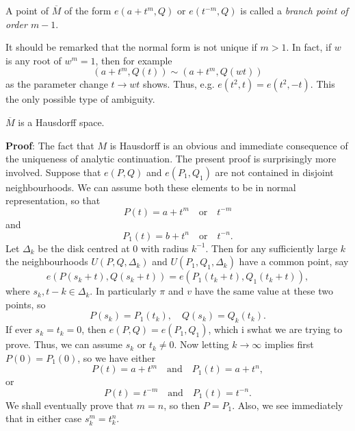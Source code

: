 \documentclass[a4paper,11pt]{article}
\begin{document}
A point of $\overline{M}$ of the form $e(a+t^m, Q)$ or $e(t^{-m}, Q)$
is called a \emph{branch point of order $m-1$}.

It should be remarked that the normal form is not unique if $m > 1$.
In fact, if $w$ is any root of $w^m = 1$, then for example
$$
(a + t^m, Q(t)) \sim (a + t^m, Q(wt))
$$
as the parameter change $t \to wt$ shows.  Thus, e.g. $e(t^2, t) =
e(t^2, -t)$.  This the only possible type of ambiguity.

\begin{propn}
  \label{propn:2}
  $\overline{M}$ is a Hausdorff space.
\end{propn}

\begin{mdframed}
  \textbf{Proof}:  The fact that $M$ is Hausdorff is an obvious and
  immediate consequence of the uniqueness of analytic continuation.
  The present proof is surprisingly more involved.  Suppose that
  $e(P,Q)$ and $e(P_1,Q_1)$ are not contained in disjoint
  neighbourhoods.  We can assume both these elements to be in normal
  representation, so that
  $$
  P(t) = a + t^m \quad \text{or}\quad t^{-m}
  $$
  and
  $$
  P_1(t) = b + t^n \quad \text{or}\quad t^{-n}.
  $$
  Let $\Delta_k$ be the disk centred at 0 with radius $k^{-1}$.  Then
  for any sufficiently large $k$ the neighbourhoods $U(P,Q,\Delta_k)$
  and $U(P_1,Q_1,\Delta_k)$ have a common point, say
  $$
  e(P(s_k + t), Q(s_k + t)) = e(P_1(t_k + t), Q_1(t_k + t)),
  $$
  where $s_k, t-k \in \Delta_k$.  In particularly $\pi$ and $v$ have
  the same value at these two points, so
  $$
  P(s_k) = P_1(t_k),\quad Q(s_k) = Q_k(t_k).
  $$
  If ever $s_k = t_k = 0$, then $e(P,Q) = e(P_1, Q_1)$, which i swhat
  we are trying to prove.  Thus, we can assume $s_k$ or $t_k \ne 0$.
  Now letting $k \to \infty$ implies first $P(0) = P_1(0)$, so we have
  either
  $$
  P(t) = a + t^m \quad\text{and}\quad P_1(t) = a + t^n,
  $$
  or
  $$
  P(t) = t^{-m} \quad\text{and}\quad P_1(t) = t^{-n}.
  $$
  We shall eventually prove that $m=n$, so then $P=P_1$.  Also, we see
  immediately that in either case $s_k^m = t_k^n$.


\end{mdframed}
\end{document}
